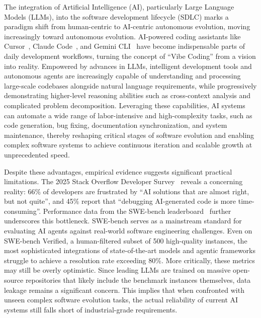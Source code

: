 The integration of Artificial Intelligence (AI), particularly Large Language Models (LLMs), into the software development lifecycle (SDLC) marks a paradigm shift from human-centric to AI-centric autonomous evolution, moving increasingly toward autonomous evolution. AI-powered coding assistants like Cursor~\cite{cursor_ai_editor}, Claude Code~\cite{claude_code}, and Gemini CLI~\cite{gemini_cli} have become indispensable parts of daily development workflows, turning the concept of ``Vibe Coding'' from a vision into reality. Empowered by advances in LLMs, intelligent development tools and autonomous agents are increasingly capable of understanding and processing large-scale codebases alongside natural language requirements, while progressively demonstrating higher-level reasoning abilities such as cross-context analysis and complicated problem decomposition. Leveraging these capabilities, AI systems can automate a wide range of labor-intensive and high-complexity tasks, such as code generation, bug fixing, documentation synchronization, and system maintenance, thereby reshaping critical stages of software evolution and enabling complex software systems to achieve continuous iteration and scalable growth at unprecedented speed.

Despite these advantages, empirical evidence suggests significant practical limitations. The 2025 Stack Overflow Developer Survey~\cite{stackoverflow2025_ai_dev_tools} reveals a concerning reality: 66\% of developers are frustrated by ``AI solutions that are almost right, but not quite'', and 45\% report that ``debugging AI-generated code is more time-consuming''. Performance data from the SWE-bench leaderboard~\cite{jimenez2024swebench} further underscores this bottleneck. SWE-bench serves as a mainstream standard for evaluating AI agents against real-world software engineering challenges. Even on SWE-bench Verified, a human-filtered subset of 500 high-quality instances, the most sophisticated integrations of state-of-the-art models and agentic frameworks struggle to achieve a resolution rate exceeding 80\%. More critically, these metrics may still be overly optimistic. Since leading LLMs are trained on massive open-source repositories that likely include the benchmark instances themselves, data leakage remains a significant concern. This implies that when confronted with unseen complex software evolution tasks, the actual reliability of current AI systems still falls short of industrial-grade requirements.

